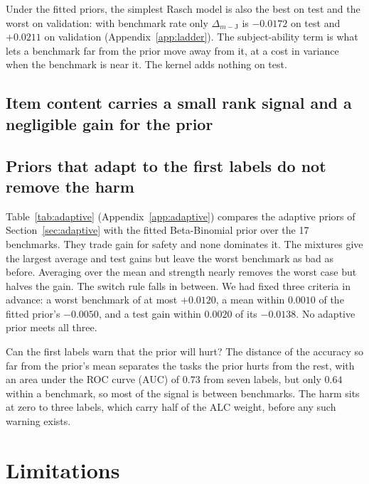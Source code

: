\documentclass{article}
\begin{document}
Under the fitted priors, the simplest Rasch model is also the best on test and the worst on validation: with benchmark rate only $\Delta_{m-\mathrm{J}}$ is $-0.0172$ on test and $+0.0211$ on validation (Appendix~\ref{app:ladder}). The subject-ability term is what lets a benchmark far from the prior move away from it, at a cost in variance when the benchmark is near it. The kernel adds nothing on test.

\subsection{Item content carries a small rank signal and a negligible gain for the prior}\label{sec:itemfeat}


\subsection{Priors that adapt to the first labels do not remove the harm}\label{sec:adaptive-results}
Table~\ref{tab:adaptive} (Appendix~\ref{app:adaptive}) compares the adaptive priors of Section~\ref{sec:adaptive} with the fitted Beta-Binomial prior over the 17 benchmarks. They trade gain for safety and none dominates it. The mixtures give the largest average and test gains but leave the worst benchmark as bad as before. Averaging over the mean and strength nearly removes the worst case but halves the gain. The switch rule falls in between. We had fixed three criteria in advance: a worst benchmark of at most $+0.0120$, a mean within $0.0010$ of the fitted prior's $-0.0050$, and a test gain within $0.0020$ of its $-0.0138$. No adaptive prior meets all three.

Can the first labels warn that the prior will hurt? The distance of the accuracy so far from the prior's mean separates the tasks the prior hurts from the rest, with an area under the ROC curve (AUC) of $0.73$ from seven labels, but only $0.64$ within a benchmark, so most of the signal is between benchmarks. The harm sits at zero to three labels, which carry half of the ALC weight, before any such warning exists.

\section{Limitations}\label{sec:limitations}

\end{document}
